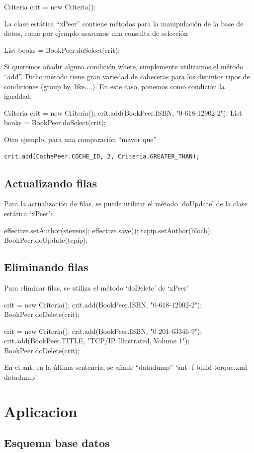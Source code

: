 \documentclass[12pt, oneside]{article}
\begin{document}
Criteria crit = new Criteria();

La clase estática “xPeer” contiene métodos para la manipulación de la base de datos, como por ejemplo usaremos una consulta de selección

List books = BookPeer.doSelect(crit);

Si queremos añadir alguna condición where, simplemente utilizamos el método “add”. Dicho método tiene gran variedad de cabeceras para los distintos tipos de condiciones (group by, like....). En este caso, ponemos como condición la igualdad:

Criteria crit = new Criteria();
crit.add(BookPeer.ISBN, "0-618-12902-2");
List books = BookPeer.doSelect(crit);

Otro ejemplo, para una comparación “mayor que”

\begin{lstlisting}
crit.add(CochePeer.COCHE_ID, 2, Criteria.GREATER_THAN);
\end{lstlisting}

\subsection{Actualizando filas} 

Para la actualización de filas, se puede utilizar el método ‘doUpdate’ de la clase estática ‘xPeer’:

effective.setAuthor(stevens);
effective.save();
tcpip.setAuthor(bloch);
BookPeer.doUpdate(tcpip);

\subsection{Eliminando filas}

Para eliminar filas, se utiliza el método ‘doDelete’ de ‘xPeer’

crit = new Criteria();
crit.add(BookPeer.ISBN, "0-618-12902-2");
BookPeer.doDelete(crit);

crit = new Criteria();
crit.add(BookPeer.ISBN, "0-201-63346-9");
crit.add(BookPeer.TITLE, "TCP/IP Illustrated, Volume 1");
BookPeer.doDelete(crit);

En el ant, en la última sentencia, se añade “datadump” 
‘ant -f build-torque.xml datadump’

\section{Aplicacion}
\subsection{Esquema base datos}

\end{document}
